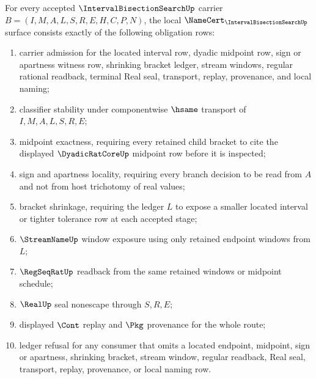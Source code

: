 \begin{theorem}
\label{thm:interval-bisection-search-namecert-obligations}
For every accepted $\IntervalBisectionSearchUp$ carrier $B=(I,M,A,L,S,R,E,H,C,P,N)$, the local $\NameCert_{\IntervalBisectionSearchUp}$ surface consists exactly of the following obligation rows:
\begin{enumerate}
\item carrier admission for the located interval row, dyadic midpoint row, sign or apartness witness row, shrinking bracket ledger, stream windows, regular rational readback, terminal Real seal, transport, replay, provenance, and local naming;
\item classifier stability under componentwise $\hsame$ transport of $I,M,A,L,S,R,E$;
\item midpoint exactness, requiring every retained child bracket to cite the displayed $\DyadicRatCoreUp$ midpoint row before it is inspected;
\item sign and apartness locality, requiring every branch decision to be read from $A$ and not from host trichotomy of real values;
\item bracket shrinkage, requiring the ledger $L$ to expose a smaller located interval or tighter tolerance row at each accepted stage;
\item $\StreamNameUp$ window exposure using only retained endpoint windows from $L$;
\item $\RegSeqRatUp$ readback from the same retained windows or midpoint schedule;
\item $\RealUp$ seal nonescape through $S,R,E$;
\item displayed $\Cont$ replay and $\Pkg$ provenance for the whole route;
\item ledger refusal for any consumer that omits a located endpoint, midpoint, sign or apartness, shrinking bracket, stream window, regular readback, Real seal, transport, replay, provenance, or local naming row.
\end{enumerate}
\end{theorem}
